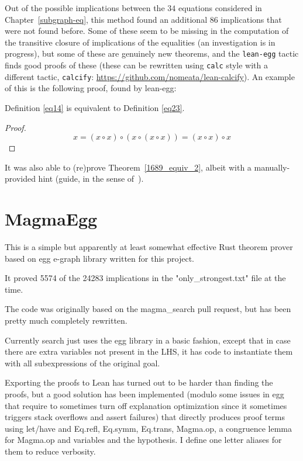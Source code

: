 Out of the possible implications between the $34$ equations considered in Chapter~\ref{subgraph-eq}, this method found an additional 86 implications that were not found before.
Some of these seem to be missing in the computation of the transitive closure of implications of the equalities (an investigation is in progress), but some of these are genuinely new theorems, and the \texttt{lean-egg} tactic finds good proofs of these (these can be rewritten using \texttt{calc} style with a different tactic, \texttt{calcify}: \url{https://github.com/nomeata/lean-calcify}). An example of this is the following proof, found by lean-egg:

\begin{theorem}[14 implies 23]\label{14_implies_23} \leanok  Definition \ref{eq14} is equivalent to Definition \ref{eq23}.
\end{theorem}

\begin{proof}

$$ x = (x \circ x) \circ (x \circ (x \circ x)) = (x \circ x) \circ x $$
\end{proof}

It was also able to (re)prove Theorem~\ref{1689_equiv_2}, albeit with a manually-provided hint (guide, in the sense of~\cite{DBLP:journals/pacmpl/KoehlerGBGTS24}).

\section{MagmaEgg}

This is a simple but apparently at least somewhat effective Rust theorem prover based on egg e-graph library written for this project.

It proved 5574 of the 24283 implications in the "only_strongest.txt" file at the time.

The code was originally based on the magma_search pull request, but has been pretty much completely rewritten.

Currently search just uses the egg library in a basic fashion, except that in case there are extra variables not present in the LHS, it has code to instantiate them with all subexpressions of the original goal.

Exporting the proofs to Lean has turned out to be harder than finding the proofs, but a good solution has been implemented (modulo some issues in egg that require to sometimes turn off explanation optimization since it sometimes triggers stack overflows and assert failures) that directly produces proof terms using let/have and Eq.refl, Eq.symm, Eq.trans, Magma.op, a congruence lemma for Magma.op and variables and the hypothesis. I define one letter aliases for them to reduce verbosity.


